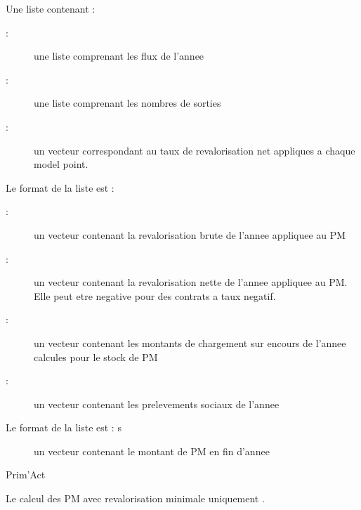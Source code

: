 \documentclass[a4paper]{book}
\begin{document}
\begin{Value}
Une liste contenant :
\begin{description}

\item[ : ] une liste comprenant les flux de l'annee
\item[ : ] une liste comprenant les nombres de sorties
\item[ : ] un vecteur correspondant au taux de revalorisation net appliques
a chaque model point.

\end{description}


Le format de la liste  est :
\begin{description}

\item[ : ] un vecteur contenant la revalorisation
brute de l'annee appliquee au PM
\item[ : ] un vecteur contenant la revalorisation
nette de l'annee appliquee au PM. Elle peut etre negative pour des contrats a taux negatif.
\item[ : ] un vecteur contenant les montants de chargement sur encours
de l'annee calcules pour le stock de PM
\item[ : ] un vecteur contenant les prelevements sociaux de l'annee

\end{description}


Le format de la liste  est :
s\begin{description}

\item[] un vecteur contenant le montant de PM en fin d'annee

\end{description}

\end{Value}
%
\begin{Author}\relax
Prim'Act
\end{Author}
%
\begin{SeeAlso}\relax
Le calcul des PM avec revalorisation minimale uniquement .
\end{SeeAlso}
\end{document}
